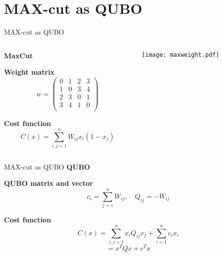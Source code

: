\documentclass{beamer}
\begin{document}
\section{MAX-cut as QUBO}
\begin{frame}{MAX-cut as QUBO}
    \begin{columns}
        \begin{column}{0.35\textwidth}
            \textbf{MaxCut}

            \vspace{0.55cm}
            \textbf{Weight matrix}
            \[
            w = \begin{pmatrix}
            0 & 1 & 2 & 3 \\
            1 & 0 & 3 & 4 \\
            2 & 3 & 0 & 1 \\
            3 & 4 & 1 & 0 \\
            \end{pmatrix}
            \]

            
            \textbf{Cost function}
            \[
            C(x) = \sum_{i,j=1}^{n} W_{ij} x_i (1 - x_j)
            \]
        \end{column}

        \begin{column}{0.40\textwidth}
            \centering
         \texttt{[image: maxweight.pdf]}
        \end{column}

        
    \end{columns}
\end{frame} 
   \begin{frame}{MAX-cut as QUBO}
    \textbf{QUBO}

            \vspace{0.5cm}
            \textbf{QUBO matrix and vector}
            \[
            c_i = \sum_{j=1}^{n} W_{ij}, \quad Q_{ij} = -W_{ij}
            \]

            \vspace{0.5cm}
            \textbf{Cost function}
            \[
            C(x) = \sum_{i,j=1}^{n} x_i Q_{ij} x_j + \sum_{i=1}^{n} c_i x_i 
            \]
            \[
            = x^T Q x + c^T x
            \]
   
    
   
   \end{frame}
\end{document}
